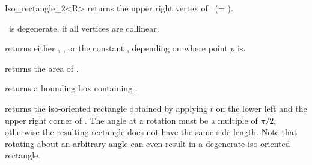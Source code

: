 \begin{ccRefClass} {Iso_rectangle_2<R>}
       {returns the upper right vertex of \ccVar\ (= ).}

\ccPredicates

       {%
        \ccVar\ is degenerate, if all vertices
        are collinear.}

       {returns either ,
        , or the constant
        , 
        depending on where point $p$ is.}

       {}
\ccGlue
{}
       {}
\ccGlue
{}
       {}


       {returns the area of \ccVar. }

       {returns a bounding box containing \ccVar. }

       {returns the iso-oriented rectangle obtained by applying $t$ on 
        the lower left and the upper right corner of \ccVar.
        \ccPrecond The angle at a rotation must be a multiple of $\pi/2$,
        otherwise the resulting rectangle does not have the same side length.
        Note that rotating about an arbitrary angle can even result in
        a degenerate  iso-oriented rectangle.}





\end{ccRefClass} 
